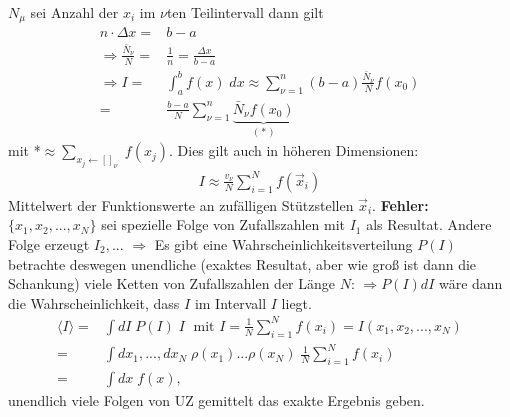 \documentclass[12pt]{article}
\begin{document}
$N_\mu$ sei Anzahl der $x_i$ im $\nu$ten Teilintervall dann gilt
\begin{align}
n \cdot \Delta x =& b-a \; \\
\Rightarrow \frac{\bar{N}_\nu}{N}=& \frac{1}{n}= \frac{\Delta x}{b-a} \\
\Rightarrow I= & \int_a^b f(x) \; dx \approx \sum_{\nu =1}^n (b-a)  \frac{\bar{N}_\nu}{N} f(x_0) \\
=& \frac{b-a}{N} \sum_{\nu =1}^n \underbrace{\bar{N}_\nu f(x_0)}_\text{( * )}
\end{align}
mit *$ \approx \sum_{x_j \leftarrow [ ]_\nu} \; f(x_j)$.
Dies gilt auch in höheren Dimensionen:
\begin{align}
I \approx \frac{v_\nu}{N} \sum_{i=1}^N f(\vec{x}_i)
\end{align}
Mittelwert der Funktionswerte an zufälligen Stützstellen $\vec{x}_i$.
\textbf{Fehler:} $\{ x_1, x_2,..., x_N\}$ sei spezielle Folge von Zufallszahlen mit $I_1$ als Resultat. Andere Folge erzeugt $I_2,...$ 
$\Rightarrow$ Es gibt eine Wahrscheinlichkeitsverteilung $P(I)$ %
betrachte deswegen unendliche (exaktes Resultat, aber wie groß ist dann die Schankung) viele Ketten von Zufallszahlen der Länge $N$: $\Rightarrow P(I) dI$ wäre dann die Wahrscheinlichkeit, dass $I$ im Intervall $I$ liegt.
\begin{align}
\langle I \rangle =& \int dI \; P(I) \; I \; \mbox{ mit } I= \frac{1}{N} \sum_{i=1}^N f(x_i)= I(x_1,x_2,...,x_N) \\
=& \int dx_1,...,dx_N \; \rho(x_1) ... \rho(x_N) \; \frac{1}{N} \sum_{i=1}^N f(x_i) \\
=& \int dx \; f(x) ,
\end{align}
unendlich viele Folgen von UZ gemittelt das exakte Ergebnis geben.
\end{document}
